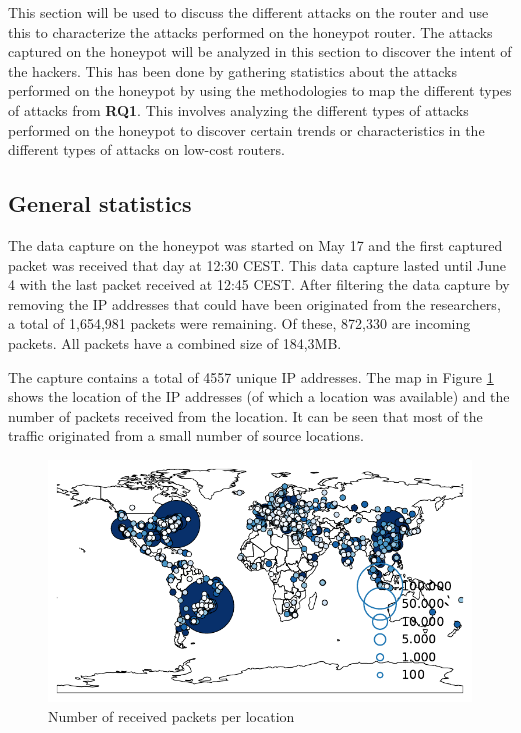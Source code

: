 This section will be used to discuss the different attacks on the router and use this to characterize the attacks performed on the honeypot router. The attacks captured on the honeypot will be analyzed in this section to discover the intent of the hackers. This has been done by gathering statistics about the attacks performed on the honeypot by using the methodologies to map the different types of attacks from \textbf{RQ1}. This involves analyzing the different types of attacks performed on the honeypot to discover certain trends or characteristics in the different types of attacks on low-cost routers.

\subsection{General statistics}
The data capture on the honeypot was started on May 17 and the first captured packet was received that day at 12:30 CEST. This data capture lasted until June 4 with the last packet received at 12:45 CEST. After filtering the data capture by removing the IP addresses that could have been originated from the researchers, a total of 1,654,981 packets were remaining. Of these, 872,330 are incoming packets. All packets have a combined size of 184,3MB.

The capture contains a total of 4557 unique IP addresses. The map in Figure \ref{fig:map_attack_location} shows the location of the IP addresses (of which a location was available) and the number of packets received from the location. It can be seen that most of the traffic originated from a small number of source locations.

\begin{figure}[ht]
    \includegraphics[width=\linewidth]{images/map_attack_locations.pdf}
    \caption{Number of received packets per location}
    \label{fig:map_attack_location}
\end{figure}

